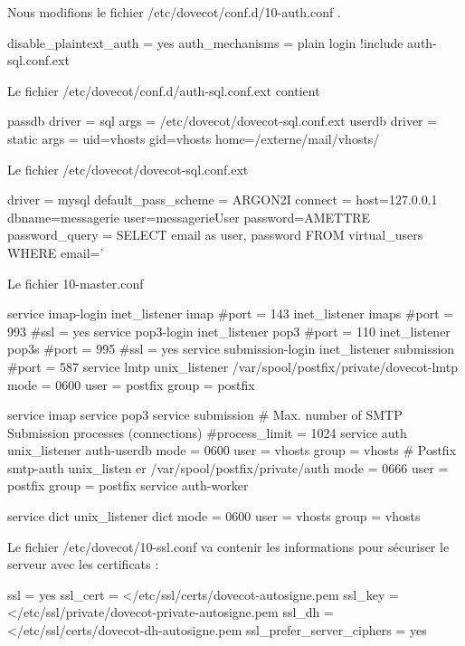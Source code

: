 \documentclass[a4paper,12pt,french]{report} %
\begin{document}
Nous modifions le fichier /etc/dovecot/conf.d/10-auth.conf .
\begin{exempleConsole}
disable_plaintext_auth = yes
auth_mechanisms = plain login
!include auth-sql.conf.ext
\end{exempleConsole}

Le fichier /etc/dovecot/conf.d/auth-sql.conf.ext contient
\begin{exempleConsole}
passdb {
  driver = sql
  args = /etc/dovecot/dovecot-sql.conf.ext
}
userdb {
  driver = static
  args = uid=vhosts gid=vhosts home=/externe/mail/vhosts/%
}
\end{exempleConsole}

Le fichier /etc/dovecot/dovecot-sql.conf.ext 
\begin{exempleConsole}
driver = mysql 
default_pass_scheme = ARGON2I
connect = host=127.0.0.1 dbname=messagerie user=messagerieUser password=AMETTRE
password_query = SELECT email as user, password FROM virtual_users WHERE email='%
\end{exempleConsole}

Le fichier 10-master.conf
\begin{exempleConsole}
service imap-login {
  inet_listener imap {
    #port = 143
  }
  inet_listener imaps {
    #port = 993
    #ssl = yes
  }
}
service pop3-login {
  inet_listener pop3 {
    #port = 110
  }
  inet_listener pop3s {
    #port = 995
    #ssl = yes
  }
}
service submission-login {
  inet_listener submission {
    #port = 587
  }
}
service lmtp {
    unix_listener /var/spool/postfix/private/dovecot-lmtp {
    mode = 0600
    user = postfix
    group = postfix
  }
}

service imap {
}
service pop3 {  
}
service submission {
  # Max. number of SMTP Submission processes (connections)
  #process_limit = 1024
}
service auth {
  unix_listener auth-userdb {
    mode = 0600
    user = vhosts
    group = vhosts 
  }
  # Postfix smtp-auth
  unix_listen  er /var/spool/postfix/private/auth {
    mode = 0666
    user = postfix
    group = postfix 
}
}
service auth-worker {
  
}
service dict {
  unix_listener dict {
    mode = 0600
    user = vhosts
    group = vhosts
  }
}
\end{exempleConsole}

Le fichier /etc/dovecot/10-ssl.conf va contenir les informations pour sécuriser le serveur avec les certificats :
\begin{exempleConsole}
ssl = yes
ssl_cert = </etc/ssl/certs/dovecot-autosigne.pem
ssl_key = </etc/ssl/private/dovecot-private-autosigne.pem
ssl_dh = </etc/ssl/certs/dovecot-dh-autosigne.pem
ssl_prefer_server_ciphers = yes
\end{exempleConsole}
\end{document}
